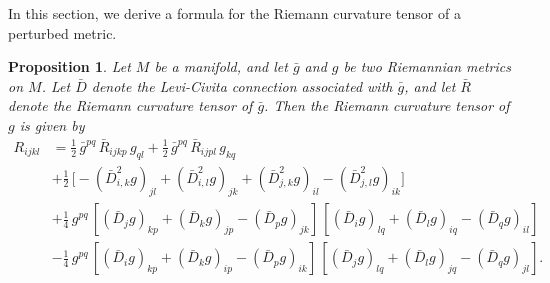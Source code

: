 \documentclass[11pt]{amsart}
\newtheorem{proposition}[theorem]{Proposition}
\theoremstyle{definition}
\begin{document}
In this section, we derive a formula for the Riemann curvature tensor of a perturbed metric.

\begin{proposition}
\label{curvature.tensor.of.perturbed.metric}
Let $M$ be a manifold, and let $\bar{g}$ and $g$ be two Riemannian metrics on $M$. Let $\bar{D}$ denote the Levi-Civita connection associated with $\bar{g}$, and let $\bar{R}$ denote the Riemann curvature tensor of $\bar{g}$. Then the Riemann curvature tensor of $g$ is given by 
\begin{align*} 
R_{ijkl} 
&= \frac{1}{2} \, \bar{g}^{pq} \, \bar{R}_{ijkp} \, g_{ql} + \frac{1}{2} \, \bar{g}^{pq} \, \bar{R}_{ijpl} \, g_{kq} \\ 
&+ \frac{1}{2} \, \big [ -(\bar{D}_{i,k}^2 g)_{jl} + (\bar{D}_{i,l}^2 g)_{jk} + (\bar{D}_{j,k}^2 g)_{il} - (\bar{D}_{j,l}^2 g)_{ik} \big ] \\ 
&+ \frac{1}{4} \, g^{pq} \, [(\bar{D}_j g)_{kp} + (\bar{D}_k g)_{jp} - (\bar{D}_p g)_{jk}] \, [(\bar{D}_i g)_{lq} + (\bar{D}_l g)_{iq} - (\bar{D}_q g)_{il}] \\ 
&- \frac{1}{4} \, g^{pq} \, [(\bar{D}_i g)_{kp} + (\bar{D}_k g)_{ip} - (\bar{D}_p g)_{ik}] \, [(\bar{D}_j g)_{lq} + (\bar{D}_l g)_{jq} - (\bar{D}_q g)_{jl}]. 
\end{align*} 
\end{proposition}
\end{document}
